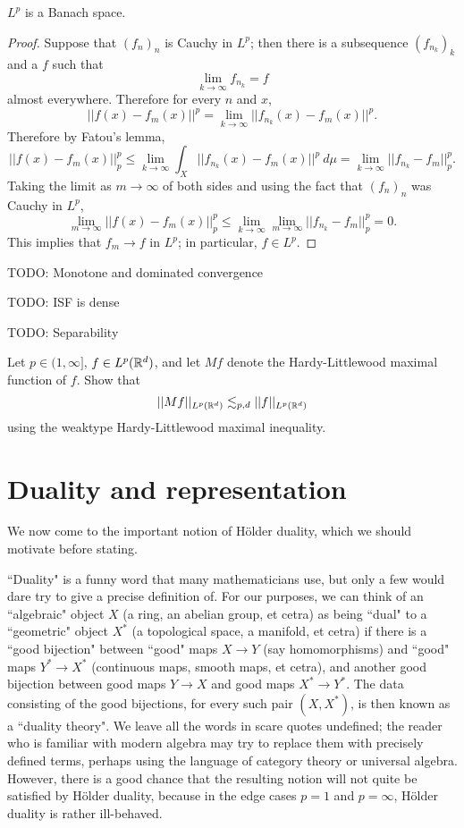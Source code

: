 \begin{theorem}
$L^p$ is a Banach space.
\end{theorem}
\begin{proof}
Suppose that $(f_n)_n$ is Cauchy in $L^p$; then there is a subsequence $(f_{n_k})_k$ and a $f$ such that
\[\lim_{k \to \infty} f_{n_k} = f\]
almost everywhere. Therefore for every $n$ and $x$,
\[||f(x) - f_m(x)||^p = \lim_{k \to \infty} ||f_{n_k}(x) - f_m(x)||^p.\]
Therefore by Fatou's lemma,
\[||f(x) - f_m(x)||_p^p \leq \lim_{k \to \infty} \int_X ||f_{n_k}(x) - f_m(x)||^p~d\mu = \lim_{k \to \infty} ||f_{n_k} - f_m||_p^p.\]
Taking the limit as $m \to \infty$ of both sides and using the fact that $(f_n)_n$ was Cauchy in $L^p$,
\[\lim_{m \to \infty} ||f(x) - f_m(x)||_p^p \leq \lim_{k \to \infty} \lim_{m \to \infty} ||f_{n_k} - f_m||_p^p = 0.\]
This implies that $f_m \to f$ in $L^p$; in particular, $f \in L^p$.
\end{proof}

TODO: Monotone and dominated convergence

TODO: ISF is dense

TODO: Separability

\begin{exercise}
Let $p \in (1, \infty]$, $f \in L^p(\mathbb{R}^d)$, and let $Mf$ denote the Hardy-Littlewood maximal function of $f$.
Show that
\[||Mf||_{L^p(\mathbb{R}^d)} \lesssim_{p,d} ||f||_{L^p(\mathbb{R}^d)}\]
using the weaktype Hardy-Littlewood maximal inequality.
\end{exercise}

\section{Duality and representation}
We now come to the important notion of H\"older duality, which we should motivate before stating.

``Duality" is a funny word that many mathematicians use, but only a few would dare try to give a precise definition of.
For our purposes, we can think of an ``algebraic" object $X$ (a ring, an abelian group, et cetra) as being ``dual" to a ``geometric" object $X^*$ (a topological space, a manifold, et cetra) if there is a ``good bijection" between ``good" maps $X \to Y$ (say homomorphisms) and ``good" maps $Y^* \to X^*$ (continuous maps, smooth maps, et cetra), and another good bijection between good maps $Y \to X$ and good maps $X^* \to Y^*$.
The data consisting of the good bijections, for every such pair $(X, X^*)$, is then known as a ``duality theory".
We leave all the words in scare quotes undefined; the reader who is familiar with modern algebra may try to replace them with precisely defined terms, perhaps using the language of category theory or universal algebra.
However, there is a good chance that the resulting notion will not quite be satisfied by H\"older duality, because in the edge cases $p = 1$ and $p = \infty$, H\"older duality is rather ill-behaved.

